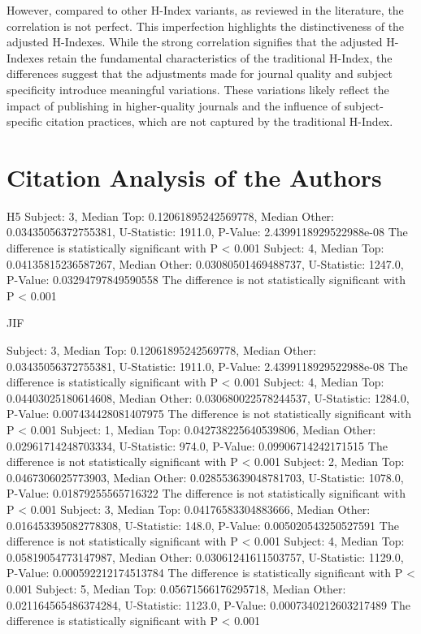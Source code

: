 However, compared to other H-Index variants, as reviewed in the literature, the
correlation is not perfect. This imperfection highlights the distinctiveness of
the adjusted H-Indexes. While the strong correlation signifies that the
adjusted H-Indexes retain the fundamental characteristics of the traditional
H-Index, the differences suggest that the adjustments made for journal quality
and subject specificity introduce meaningful variations. These variations
likely reflect the impact of publishing in higher-quality journals and the
influence of subject-specific citation practices, which are not captured by the
traditional H-Index.

\section{Citation Analysis of the Authors}

H5 Subject: 3, Median Top: 0.12061895242569778, Median Other:
0.03435056372755381, U-Statistic: 1911.0, P-Value: 2.4399118929522988e-08 The
difference is statistically significant with P < 0.001 Subject: 4, Median Top:
0.04135815236587267, Median Other: 0.03080501469488737, U-Statistic: 1247.0,
P-Value: 0.03294797849590558 The difference is not statistically significant
with P < 0.001

JIF

Subject: 3, Median Top: 0.12061895242569778, Median Other: 0.03435056372755381,
U-Statistic: 1911.0, P-Value: 2.4399118929522988e-08 The difference is
statistically significant with P < 0.001 Subject: 4, Median Top:
0.04403025180614608, Median Other: 0.030680022578244537, U-Statistic: 1284.0,
P-Value: 0.007434428081407975 The difference is not statistically significant
with P < 0.001 Subject: 1, Median Top: 0.042738225640539806, Median Other:
0.02961714248703334, U-Statistic: 974.0, P-Value: 0.09906714242171515 The
difference is not statistically significant with P < 0.001 Subject: 2, Median
Top: 0.0467306025773903, Median Other: 0.028553639048781703, U-Statistic:
1078.0, P-Value: 0.01879255565716322 The difference is not statistically
significant with P < 0.001 Subject: 3, Median Top: 0.04176583304883666, Median
Other: 0.016453395082778308, U-Statistic: 148.0, P-Value: 0.005020543250527591
The difference is not statistically significant with P < 0.001 Subject: 4,
Median Top: 0.05819054773147987, Median Other: 0.03061241611503757,
U-Statistic: 1129.0, P-Value: 0.000592212174513784 The difference is
statistically significant with P < 0.001 Subject: 5, Median Top:
0.05671566176295718, Median Other: 0.021164565486374284, U-Statistic: 1123.0,
P-Value: 0.0007340212603217489 The difference is statistically significant with
P < 0.001

